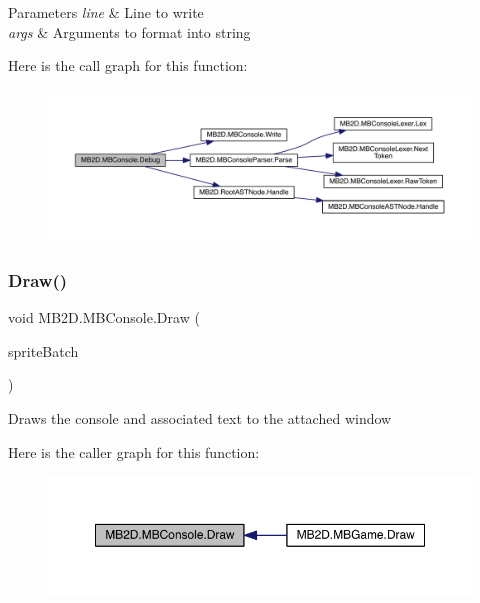 \begin{DoxyParams}{Parameters}
{\em line} & Line to write\\
\hline
{\em args} & Arguments to format into string\\
\hline
\end{DoxyParams}
Here is the call graph for this function\+:\nopagebreak
\begin{figure}[H]
\begin{center}
\leavevmode
\includegraphics[width=350pt]{class_m_b2_d_1_1_m_b_console_a918307d1a003684b1fa3e0d11243b1f9_cgraph}
\end{center}
\end{figure}
\hypertarget{class_m_b2_d_1_1_m_b_console_ab737469f6fe24b287f7979f788adb8c9}{}\label{class_m_b2_d_1_1_m_b_console_ab737469f6fe24b287f7979f788adb8c9} 
\subsubsection{\texorpdfstring{Draw()}{Draw()}}
{\footnotesize\ttfamily void M\+B2\+D.\+M\+B\+Console.\+Draw (\begin{DoxyParamCaption}\item[{Sprite\+Batch}]{sprite\+Batch }\end{DoxyParamCaption})\hspace{0.3cm}{\ttfamily [inline]}}



Draws the console and associated text to the attached window 

Here is the caller graph for this function\+:\nopagebreak
\begin{figure}[H]
\begin{center}
\leavevmode
\includegraphics[width=350pt]{class_m_b2_d_1_1_m_b_console_ab737469f6fe24b287f7979f788adb8c9_icgraph}
\end{center}
\end{figure}
\hypertarget{class_m_b2_d_1_1_m_b_console_a745ef1f55523b29b83d4d94c1fe5400b}{}\label{class_m_b2_d_1_1_m_b_console_a745ef1f55523b29b83d4d94c1fe5400b} 
